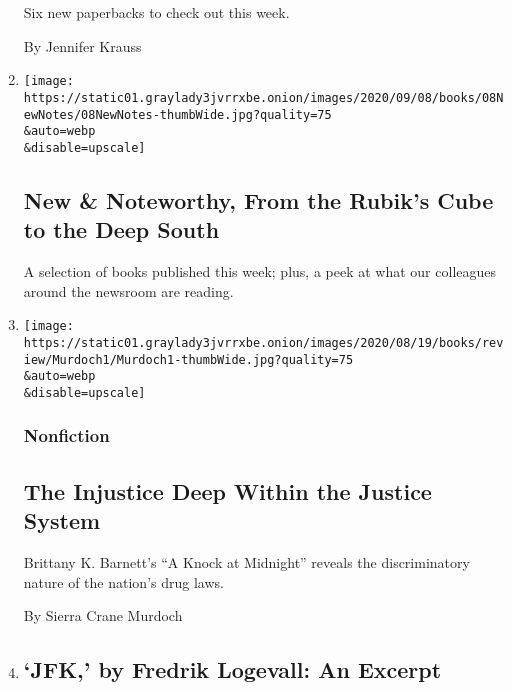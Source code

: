 \begin{enumerate}
  Six new paperbacks to check out this week.

  By Jennifer Krauss
\item
  \href{/2020/09/08/books/review/new-this-week.html}{}

  \texttt{[image: https://static01.graylady3jvrrxbe.onion/images/2020/09/08/books/08NewNotes/08NewNotes-thumbWide.jpg?quality=75\\\&auto=webp\\\&disable=upscale]}

  \hypertarget{new--noteworthy-from-the-rubiks-cube-to-the-deep-south}{%
  \subsection{New \& Noteworthy, From the Rubik's Cube to the Deep
  South}\label{new--noteworthy-from-the-rubiks-cube-to-the-deep-south}}

  A selection of books published this week; plus, a peek at what our
  colleagues around the newsroom are reading.
\item
  \href{/2020/09/08/books/review/a-knock-at-midnight-brittany-k-barnett.html}{}

  \texttt{[image: https://static01.graylady3jvrrxbe.onion/images/2020/08/19/books/review/Murdoch1/Murdoch1-thumbWide.jpg?quality=75\\\&auto=webp\\\&disable=upscale]}

  \hypertarget{nonfiction-6}{%
  \subsubsection{Nonfiction}\label{nonfiction-6}}

  \hypertarget{the-injustice-deep-within-the-justice-system}{%
  \subsection{The Injustice Deep Within the Justice
  System}\label{the-injustice-deep-within-the-justice-system}}

  Brittany K. Barnett's ``A Knock at Midnight'' reveals the
  discriminatory nature of the nation's drug laws.

  By Sierra Crane Murdoch
\item
  \href{/2020/09/08/books/review/jfk-by-fredrik-logevall-an-excerpt.html}{}

  \hypertarget{jfk-by-fredrik-logevall-an-excerpt}{%
  \subsection{`JFK,' by Fredrik Logevall: An
  Excerpt}\label{jfk-by-fredrik-logevall-an-excerpt}}


\end{enumerate}
